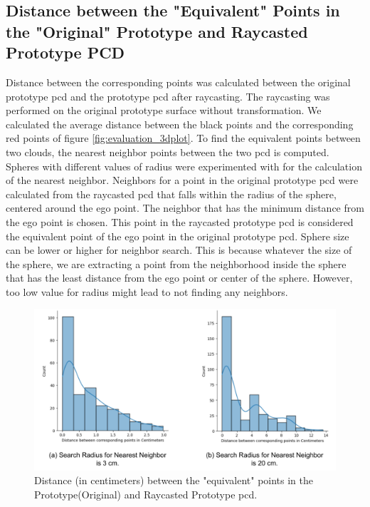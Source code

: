 \subsection{Distance between the "Equivalent" Points in the "Original" Prototype and Raycasted Prototype PCD}
Distance between the corresponding points was calculated between the original prototype \acrshort{pcd} and the prototype \acrshort{pcd} after raycasting. The raycasting was performed on the original prototype surface without transformation. We calculated the average distance between the black points and the corresponding red points of figure \ref{fig:evaluation_3dplot}. To find the equivalent points between two clouds, the nearest neighbor points between the two \acrshort{pcd} is computed. Spheres with different values of radius were experimented with for the calculation of the nearest neighbor. Neighbors for a point in the original prototype \acrshort{pcd} were calculated from the raycasted \acrshort{pcd} that falls within the radius of the sphere, centered around the ego point. The neighbor that has the minimum distance from the ego point is chosen. This point in the raycasted prototype \acrshort{pcd} is considered the equivalent point of the ego point in the original prototype \acrshort{pcd}. Sphere size can be lower or higher for neighbor search. This is because whatever the size of the sphere, we are extracting a point from the neighborhood inside the sphere that has the least distance from the ego point or center of the sphere. However, too low value for radius might lead to not finding any neighbors.
\begin{figure}[htbp]
    \centering
    \includegraphics[width=1\linewidth]{97_graphics/evaluation/distn_betn_corresponding_points_in_raycasting.pdf}
    \caption{Distance (in centimeters) between the "equivalent" points in the Prototype(Original) and Raycasted Prototype \acrshort{pcd}.}
    \label{fig:evaluation_distn_corresponding_points}
\end{figure}

